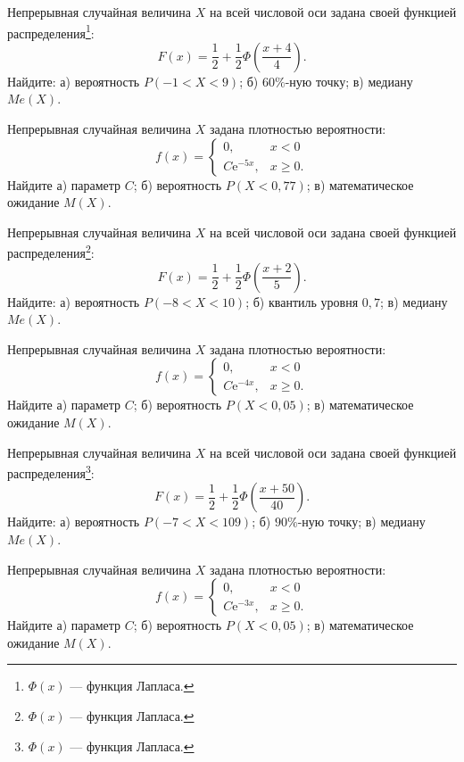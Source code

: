 \vfill

\newpage\setcounter{zad}{0}

\z Непрерывная случайная величина $X$ на всей числовой оси задана своей функцией распределения\footnote{$\Phi(x)$ --- функция Лапласа.}: $$ F(x) = \frac{1}{2} + \frac{1}{2}\Phi\left( \frac{x + 4}{4} \right). $$ Найдите: а) вероятность $P(-1 < X < 9)$; б) $60\%$-ную точку; в) медиану $Me(X)$.


\vfill

\z Непрерывная случайная величина $X$ задана плотностью вероятности: $$ f(x) = \begin{cases}0, & x < 0 \\ C\mathrm{e}^{-5x}, & x \geqslant 0.\end{cases} $$ Найдите а) параметр $C$; б) вероятность $P(X < 0{,}77)$; в) математическое ожидание $M(X)$.
 

\vfill

\newpage\setcounter{zad}{0}

\z Непрерывная случайная величина $X$ на всей числовой оси задана своей функцией распределения\footnote{$\Phi(x)$ --- функция Лапласа.}: $$ F(x) = \frac{1}{2} + \frac{1}{2}\Phi\left( \frac{x + 2}{5} \right). $$ Найдите: а) вероятность $P(-8 < X < 10)$; б) квантиль уровня $0{,}7$; в) медиану $Me(X)$.


\vfill

\z Непрерывная случайная величина $X$ задана плотностью вероятности: $$ f(x) = \begin{cases}0, & x < 0 \\ C\mathrm{e}^{-4x}, & x \geqslant 0.\end{cases} $$ Найдите а) параметр $C$; б) вероятность $P(X < 0{,}05)$; в) математическое ожидание $M(X)$.
 

\vfill

\newpage\setcounter{zad}{0}

\z Непрерывная случайная величина $X$ на всей числовой оси задана своей функцией распределения\footnote{$\Phi(x)$ --- функция Лапласа.}: $$ F(x) = \frac{1}{2} + \frac{1}{2}\Phi\left( \frac{x + 50}{40} \right). $$ Найдите: а) вероятность $P(-7 < X < 109)$; б) $90\%$-ную точку; в) медиану $Me(X)$.


\vfill

\z Непрерывная случайная величина $X$ задана плотностью вероятности: $$ f(x) = \begin{cases}0, & x < 0 \\ C\mathrm{e}^{-3x}, & x \geqslant 0.\end{cases} $$ Найдите а) параметр $C$; б) вероятность $P(X < 0{,}05)$; в) математическое ожидание $M(X)$.
 

